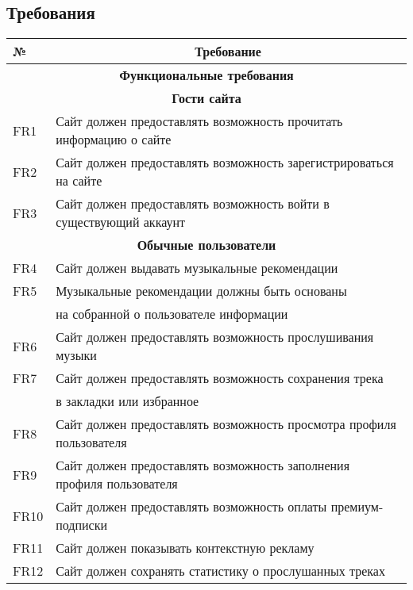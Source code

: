 \subsection{Требования}
\begin{longtable}{|l|l|}
    \hline
    № & \multicolumn{1}{|c|}{\textbf{Требование}} \\ \hline
    \endhead

    \multicolumn{2}{|c|}{\textbf{Функциональные требования}} \\ \hline

    \multicolumn{2}{|c|}{\textbf{Гости сайта}} \\ \hline
    FR1 & Сайт должен предоставлять возможность прочитать информацию о сайте \\ \hline
    FR2 & Сайт должен предоставлять возможность зарегистрироваться на сайте \\ \hline
    FR3 & Сайт должен предоставлять возможность войти в существующий аккаунт \\ \hline

    \multicolumn{2}{|c|}{\textbf{Обычные пользователи}} \\ \hline
    FR4 & Сайт должен выдавать музыкальные рекомендации \\ \hline
    FR5 & Музыкальные рекомендации должны быть основаны \\
    & на собранной о пользователе информации \\ \hline
    FR6 & Сайт должен предоставлять возможность прослушивания музыки \\ \hline
    FR7 & Сайт должен предоставлять возможность сохранения трека \\
    & в закладки или избранное \\ \hline
    FR8 & Сайт должен предоставлять возможность просмотра профиля пользователя \\ \hline
    FR9 & Сайт должен предоставлять возможность заполнения профиля пользователя \\ \hline
    FR10 & Сайт должен предоставлять возможность оплаты премиум-подписки \\ \hline
    FR11 & Сайт должен показывать контекстную рекламу \\ \hline
    FR12 & Сайт должен сохранять статистику о прослушанных треках \\ \hline


\end{longtable}
